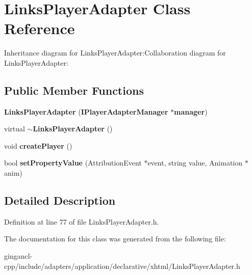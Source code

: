 \section{LinksPlayerAdapter Class Reference}
\label{classbr_1_1pucrio_1_1telemidia_1_1ginga_1_1ncl_1_1adapters_1_1application_1_1xhtml_1_1LinksPlayerAdapter}
Inheritance diagram for LinksPlayerAdapter:Collaboration diagram for LinksPlayerAdapter:\subsection*{Public Member Functions}
\begin{CompactItemize}
\item 
\textbf{LinksPlayerAdapter} ({\bf IPlayerAdapterManager} $\ast${\bf manager})\label{classbr_1_1pucrio_1_1telemidia_1_1ginga_1_1ncl_1_1adapters_1_1application_1_1xhtml_1_1LinksPlayerAdapter_a1eb3f4597d27ded53daef05d5cb21c2}

\item 
virtual {\bf $\sim$LinksPlayerAdapter} ()\label{classbr_1_1pucrio_1_1telemidia_1_1ginga_1_1ncl_1_1adapters_1_1application_1_1xhtml_1_1LinksPlayerAdapter_1aa74aff1bec089720da68a40d4aa9d2}

\item 
void \textbf{createPlayer} ()\label{classbr_1_1pucrio_1_1telemidia_1_1ginga_1_1ncl_1_1adapters_1_1application_1_1xhtml_1_1LinksPlayerAdapter_2fbb9533e3d66799b0a433c9298ea70f}

\item 
bool \textbf{setPropertyValue} (AttributionEvent $\ast$event, string value, Animation $\ast$anim)\label{classbr_1_1pucrio_1_1telemidia_1_1ginga_1_1ncl_1_1adapters_1_1application_1_1xhtml_1_1LinksPlayerAdapter_3e4b84e57de627326fc7bf7c4e129ba5}

\end{CompactItemize}


\subsection{Detailed Description}




Definition at line 77 of file LinksPlayerAdapter.h.

The documentation for this class was generated from the following file:\begin{CompactItemize}
\item 
gingancl-cpp/include/adapters/application/declarative/xhtml/LinksPlayerAdapter.h\end{CompactItemize}
